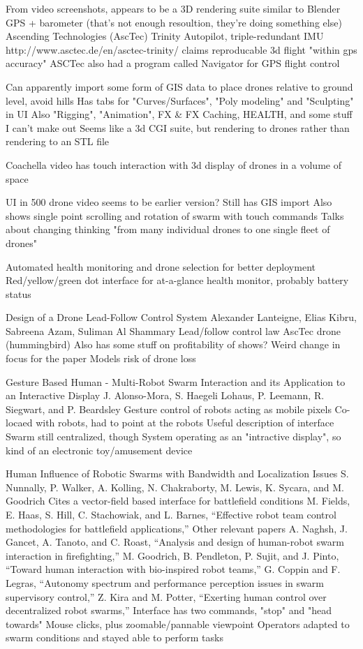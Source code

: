 	From video screenshots, appears to be a 3D rendering suite similar to Blender
	GPS + barometer (that's not enough resoultion, they're doing something else)
		Ascending Technologies (AscTec) Trinity Autopilot, triple-redundant IMU
		http://www.asctec.de/en/asctec-trinity/ claims reproducable 3d flight "within gps accuracy"
		ASCTec also had a program called Navigator for GPS flight control

	Can apparently import some form of GIS data to place drones relative to ground level, avoid hills
	Has tabs for "Curves/Surfaces", "Poly modeling" and "Sculpting" in UI
	Also "Rigging", "Animation", FX \& FX Caching, HEALTH, and some stuff I can't make out
	Seems like a 3d CGI suite, but rendering to drones rather than rendering to an STL file

	Coachella video has touch interaction with 3d display of drones in a volume of space

	UI in 500 drone video seems to be earlier version? Still has GIS import
	Also shows single point scrolling and rotation of swarm with touch commands
	Talks about changing thinking "from many individual drones to one single fleet of drones"

	Automated health monitoring and drone selection for better deployment
	Red/yellow/green dot interface for at-a-glance health monitor, probably battery status

Design of a Drone Lead-Follow Control System
Alexander Lanteigne, Elias Kibru, Sabreena Azam, Suliman Al Shammary
	Lead/follow control law
	AscTec drone (hummingbird)
	Also has some stuff on profitability of shows?
		Weird change in focus for the paper
	Models risk of drone loss

Gesture Based Human - Multi-Robot Swarm Interaction
and its Application to an Interactive Display
J. Alonso-Mora, S. Haegeli Lohaus, P. Leemann, R. Siegwart, and P. Beardsley
	Gesture control of robots acting as mobile pixels
	Co-locaed with robots, had to point at the robots
	Useful description of interface
	Swarm still centralized, though
	System operating as an "intractive display", so kind of an electronic toy/amusement device


Human Influence of Robotic Swarms with Bandwidth and Localization Issues
S. Nunnally, P. Walker, A. Kolling, N. Chakraborty, M. Lewis, K. Sycara, and M. Goodrich
	Cites a vector-field based interface for battlefield conditions
		M. Fields, E. Haas, S. Hill, C. Stachowiak, and L. Barnes, “Effective robot team control methodologies for battlefield applications,”
	Other relevant papers
		A. Naghsh, J. Gancet, A. Tanoto, and C. Roast, “Analysis and design of human-robot swarm interaction in firefighting,”
		M. Goodrich, B. Pendleton, P. Sujit, and J. Pinto, “Toward human interaction with bio-inspired robot teams,”
		G. Coppin and F. Legras, “Autonomy spectrum and performance perception issues in swarm supervisory control,”
		Z. Kira and M. Potter, “Exerting human control over decentralized robot swarms,”
	Interface has two commands, "stop" and "head towards"
		Mouse clicks, plus zoomable/pannable viewpoint
	Operators adapted to swarm conditions and stayed able to perform tasks

